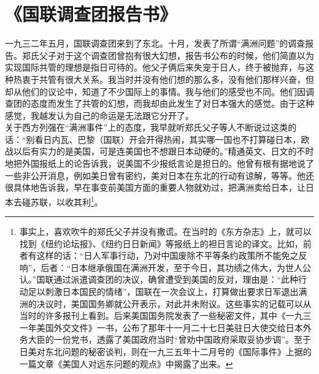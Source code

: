 \fancyhead[RO]{} %
\fancyhead[LE]{} %
\chapter*{《国联调查团报告书》}
\thispagestyle{empty}
一九三二年五月，国联调查团来到了东北。十月，发表了所谓“满洲问题”的调查报告。郑氏父子对于这个调查团曾抱有很大幻想，报告书公布的时候，他们简直以为实现国际共管的理想是指日可待的。他父子俩后来失宠于日人，终于被抛弃，与这种热衷于共管有很大关系。我当时并没有他们想的那么多，没有他们那样兴奋，但却从他们的议论中，知道了不少国际上的事情。我与他们的感受也不同。他们因调查团的态度而发生了共管的幻想，而我却由此发生了对日本强大的感觉。由于这种感觉，我越发认为自己的命运是无法跟它分开了。\\

关于西方列强在“满洲事件”上的态度，我早就听郑氏父子等人不断说过这类的话：“别看日内瓦、巴黎（国联）开会开得热闹，其实哪一国也不打算碰日本，欧战以后有实力的是美国，可是连美国也不想跟日本动硬的。”精通英文、日文的不时地把外国报纸上的论告诉我，说美国不少报纸言论是担日的。他曾有根有据地说了一些非公开消息，例如美日曾有密约，美对日本在东北的行动有谅解，等等。他还很具体地告诉我，早在事变前美国方面的重要人物就劝过，把满洲卖给日本，让日本去碰苏联，以收其利\footnote{事实上，喜欢吹牛的郑氏父子并没有撒谎。在当时的《东方杂志》上，就可以找到《纽约论坛报》、《纽约日日新闻》等报纸上的袒日言论的译文。比如，前者有这样的话：“日人军事行动，乃对中国废除不平等条约政策所不能免之反响”，后者：“日本继承俄国在满洲开发，至于今日，其功绩之伟大，为世人公认。”国联通过派遣调查团的决议，确曾遭受到美国的反对，理由是：“此种行动足以刺激日本国民的情绪”，国联在一次会议上，打算做出要求日军退出满洲的决议时，美国国务卿就公开表示，对此并未附议。这些事实的记载可以从当时的许多报刊上看到。后来美国国务院发表了一些秘密文件，其中《一九三一年美国外交文件》一书，公布了那年十一月二十七日美驻日大使交给日本外务大臣的一份党书，透露了美国政府当时“曾劝中国政府采取妥协步调”。至于日美对东北问题的秘密谈判，则在一九三五年十二月号的《国际事件》上据的一篇文章《美国人对远东问题的观点》中揭露了出来。}。\\

